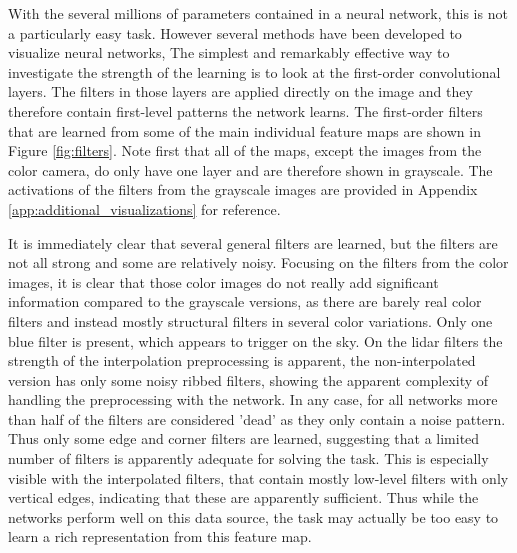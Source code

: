 With the several millions of parameters contained in a neural network, this is not a particularly easy task. However several methods have been developed to visualize neural networks,  The simplest and remarkably effective way to investigate the strength of the learning is to look at the first-order convolutional layers. The filters in those layers are applied directly on the image and they therefore contain first-level patterns the network learns. The first-order filters that are learned from some of the main individual feature maps are shown in Figure \ref{fig:filters}. Note first that all of the maps, except the images from the color camera, do only have one layer and are therefore shown in grayscale. The activations of the filters from the grayscale images are provided in Appendix \ref{app:additional_visualizations} for reference.

It is immediately clear that several general filters are learned, but the filters are not all strong and some are relatively noisy. Focusing on the filters from the color images, it is clear that those color images do not really add significant information compared to the grayscale versions, as there are barely real color filters and instead mostly structural filters in several color variations. Only one blue filter is present, which appears to trigger on the sky. On the lidar filters the strength of the interpolation preprocessing is apparent, the non-interpolated version has only some noisy ribbed filters, showing the apparent complexity of handling the preprocessing with the network. In any case, for all networks more than half of the filters are considered 'dead' as they only contain a noise pattern. Thus only some edge and corner filters are learned, suggesting that a limited number of filters is apparently adequate for solving the task. This is especially visible with the interpolated filters, that contain mostly low-level filters with only vertical edges, indicating that these are apparently sufficient. Thus while the networks perform well on this data source, the task may actually be too easy to learn a rich representation from this feature map.

